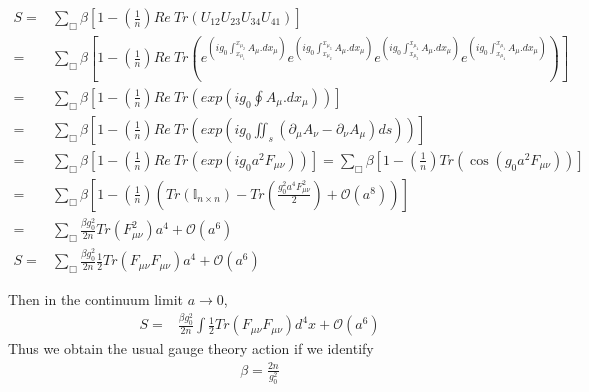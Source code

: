 \documentclass[]{article}
\numberwithin{equation}{section}
\begin{document}
\begin{align}
    S=&\sum_\Box \beta\left[1-\left(\frac{1}{n}\right)Re~Tr\left(U_{12}U_{23}U_{34}U_{41}\right)\right]\\
    =&\sum_\Box \beta\left[1-\left(\frac{1}{n}\right)Re~Tr\left(e^{\left(ig_0\int_{x_\mu_1}^{x_\mu_2}A_{\mu}.dx_{\mu}\right)}e^{\left(ig_0\int_{x_\mu_2}^{x_\mu_3}A_{\mu}.dx_{\mu}\right)}e^{\left(ig_0\int_{x_\mu_3}^{x_\mu_4}A_{\mu}.dx_{\mu}\right)}e^{\left(ig_0\int_{x_\mu_4}^{x_\mu_1}A_{\mu}.dx_{\mu}\right)}\right)\right]\\
    =&\sum_\Box \beta\left[1-\left(\frac{1}{n}\right)Re~Tr\left(exp{\left(ig_0\oint A_{\mu}.dx_{\mu}\right)}\right)\right]\\
    =&\sum_\Box \beta\left[1-\left(\frac{1}{n}\right)Re~Tr\left(exp{\left(ig_0\iint_s (\partial_\mu A_\nu-\partial_\nu A_\mu)ds\right)}\right)\right]\\
    =&\sum_\Box \beta\left[1-\left(\frac{1}{n}\right)Re~Tr\left(exp{\left(ig_0a^2 F_{\mu\nu}\right)}\right)\right]=\sum_\Box \beta\left[1-\left(\frac{1}{n}\right)Tr\left(\cos{\left(g_0a^2 F_{\mu\nu}\right)}\right)\right]\\
    =&\sum_\Box \beta\left[1-\left(\frac{1}{n}\right)\left(Tr(\mathbb{I}_{n\times n})-Tr\left(\frac{g^2_0a^4F^2_{\mu\nu}}{2}\right)+\mathcal{O}(a^8)\right)\right]\\
    =&\sum_\Box \frac{\beta g^2_0}{2n}Tr(F^2_{\mu\nu})a^4+\mathcal{O}(a^6)\\
    S=&\sum_\Box \frac{\beta g^2_0}{2n}\frac{1}{2}Tr(F_{\mu\nu}F_{\mu\nu})a^4+\mathcal{O}(a^6)
\end{align}

Then in the continuum limit $a\longrightarrow0$,
 \begin{align}
     S=& \frac{\beta g^2_0}{2n}\int\frac{1}{2}Tr(F_{\mu\nu}F_{\mu\nu})d^4x+\mathcal{O}(a^6)
 \end{align}
Thus we obtain the usual gauge theory action if we identify
\begin{align}
    \beta=\frac{2n}{g_0^2}
\end{align}
\end{document}
